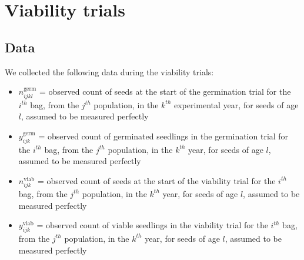 \documentclass[12pt, oneside, titlepage]{article}   	%
\begin{document}
\begin{figure}[h]
\begin{subfigure}[c]{\textwidth}
\end{subfigure}
\end{figure}



\clearpage
\newpage



\section{Viability trials}\label{section-3}

\subsection{Data}

We collected the following data during the viability trials: 

\begin{itemize}
	\item $n^{\mathrm{germ}}_{ijkl}$ = observed count of seeds at the start of the germination trial for the $i^{th}$ bag, from the $j^{th}$ population, in the $k^{th}$ experimental year, for seeds of age $l$, assumed to be measured perfectly
	\item $y^{\mathrm{germ}}_{ijk}$ = observed count of germinated seedlings in the germination trial for the $i^{th}$ bag, from the $j^{th}$ population, in the $k^{th}$ year, for seeds of age $l$, assumed to be measured perfectly 
	\item $n^{\mathrm{viab}}_{ijk}$ = observed count of seeds at the start of the viability trial for the $i^{th}$ bag, from the $j^{th}$ population, in the $k^{th}$ year, for seeds of age $l$, assumed to be measured perfectly 
	\item $y^{\mathrm{viab}}_{ijk}$ = observed count of viable seedlings in the viability trial for the $i^{th}$ bag, from the $j^{th}$ population, in the $k^{th}$ year, for seeds of age $l$, assumed to be measured perfectly 
\end{itemize}
\end{document}

